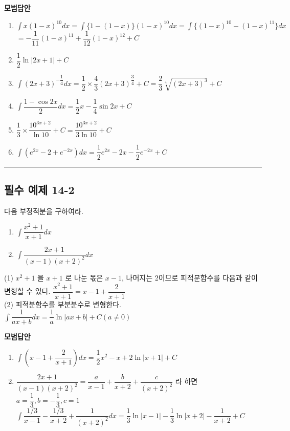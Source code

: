 \documentclass[a4paper,11pt]{article}
\begin{document}
\textbf{모범답안}
\begin{enumerate}[label=(\arabic*)]
    \item $\int x(1-x)^{10}dx=\int\{1-(1-x)\}(1-x)^{10}dx=\int\{(1-x)^{10}-(1-x)^{11}\}dx$ \\
    $=-\dfrac{1}{11}(1-x)^{11}+\dfrac{1}{12}(1-x)^{12}+C$
    \item $\dfrac{1}{2}\ln|2x+1|+C$
    \item $\int(2x+3)^{-\dfrac{1}{4}}dx=\dfrac{1}{2}\times\dfrac{4}{3}(2x+3)^{\dfrac{3}{4}}+C=\dfrac{2}{3}\sqrt[4]{(2x+3)^{3}}+C$
    \item $\int\dfrac{1-\cos 2x}{2}dx=\dfrac{1}{2}x-\dfrac{1}{4}\sin 2x+C$
    \item $\dfrac{1}{3}\times\dfrac{10^{3x+2}}{\ln 10}+C=\dfrac{10^{3x+2}}{3\ln 10}+C$
    \item $\int(e^{2x}-2+e^{-2x})dx=\dfrac{1}{2}e^{2x}-2x-\dfrac{1}{2}e^{-2x}+C$
\end{enumerate}

\vspace{0.5cm}
\hrule
\vspace{0.5cm}

\subsection*{필수 예제 14-2}
다음 부정적분을 구하여라.
\begin{enumerate}[label=(\arabic*)]
    \item $\int\dfrac{x^{2}+1}{x+1}dx$
    \item $\int\dfrac{2x+1}{(x-1)(x+2)^{2}}dx$
\end{enumerate}

\begin{studybox}
(1) $x^{2}+1$ 을 $x+1$ 로 나눈 몫은 $x-1$, 나머지는 2이므로 피적분함수를 다음과 같이 변형할 수 있다. $\dfrac{x^{2}+1}{x+1}=x-1+\dfrac{2}{x+1}$ \\
(2) 피적분함수를 부분분수로 변형한다. \\
$\int\dfrac{1}{ax+b}dx=\dfrac{1}{a}\ln|ax+b|+C(a\ne0)$
\end{studybox}

\textbf{모범답안}
\begin{enumerate}[label=(\arabic*)]
    \item $\int(x-1+\dfrac{2}{x+1})dx=\dfrac{1}{2}x^{2}-x+2\ln|x+1|+C$
    \item $\dfrac{2x+1}{(x-1)(x+2)^{2}}=\dfrac{a}{x-1}+\dfrac{b}{x+2}+\dfrac{c}{(x+2)^{2}}$ 라 하면 $a=\dfrac{1}{3}, b=-\dfrac{1}{3}, c=1$ \\
    $\int\dfrac{1/3}{x-1}-\dfrac{1/3}{x+2}+\dfrac{1}{(x+2)^{2}}dx=\dfrac{1}{3}\ln|x-1|-\dfrac{1}{3}\ln|x+2|-\dfrac{1}{x+2}+C$
\end{enumerate}
\end{document}
